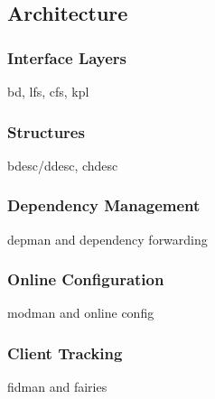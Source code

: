 \subsection{Architecture}
\label{subsec:arch}

\subsubsection{Interface Layers}
bd, lfs, cfs, kpl
\subsubsection{Structures}
bdesc/ddesc, chdesc
\subsubsection{Dependency Management}
depman and dependency forwarding
\subsubsection{Online Configuration}
modman and online config
\subsubsection{Client Tracking}
fidman and fairies
